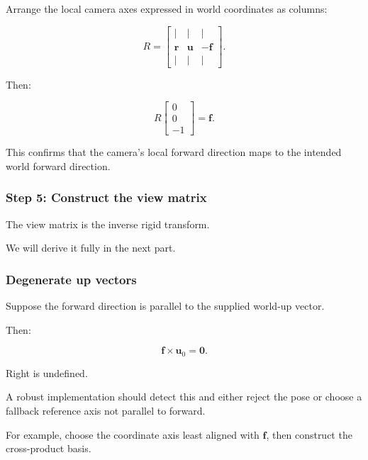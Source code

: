 \hypertarget{02-foundations-ii-ch032-step-4-construct-camera-to-world-rotation}{}

Arrange the local camera axes expressed in world coordinates as columns:

\[
 \boxed{ R= \begin{bmatrix} |&|&|\\ \mathbf r&\mathbf u&-\mathbf f\\ |&|&| \end{bmatrix} }.
\]

Then:

\[
 R \begin{bmatrix}0\\0\\-1\end{bmatrix} = \mathbf f.
\]

This confirms that the camera's local forward direction maps to the intended world forward direction.

\subsubsection{Step 5: Construct the view matrix}\label{02-foundations-ii-ch032-step-5-construct-the-view-matrix}

\hypertarget{02-foundations-ii-ch032-step-5-construct-the-view-matrix}{}

The view matrix is the inverse rigid transform.

We will derive it fully in the next part.

\subsubsection{Degenerate up vectors}\label{02-foundations-ii-ch032-degenerate-up-vectors}

\hypertarget{02-foundations-ii-ch032-degenerate-up-vectors}{}

Suppose the forward direction is parallel to the supplied world-up vector.

Then:

\[
 \mathbf f\times\mathbf u_0=\mathbf0.
\]

Right is undefined.

A robust implementation should detect this and either reject the pose or choose a fallback reference axis not parallel to forward.

For example, choose the coordinate axis least aligned with \(\mathbf f\), then construct the cross-product basis.

